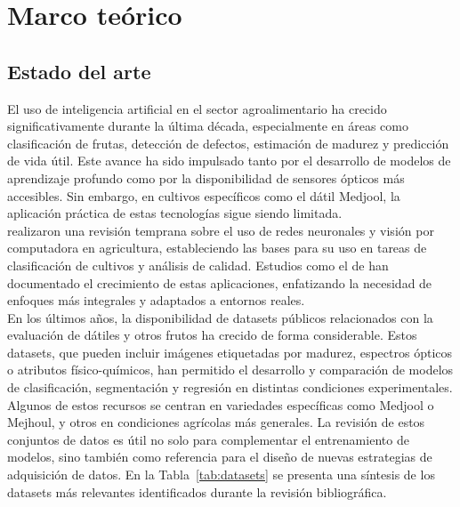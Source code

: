 
\chapter{Marco teórico}

\label{Chapter3}


\section{Estado del arte}

El uso de inteligencia artificial en el sector agroalimentario ha crecido significativamente durante la última década, especialmente en áreas como clasificación de frutas, detección de defectos, estimación de madurez y predicción de vida útil. Este avance ha sido impulsado tanto por el desarrollo de modelos de aprendizaje profundo como por la disponibilidad de sensores ópticos más accesibles. Sin embargo, en cultivos específicos como el dátil Medjool, la aplicación práctica de estas tecnologías sigue siendo limitada.\\

\parencite{kamilaris_deep_2018} realizaron una revisión temprana sobre el uso de redes neuronales y visión por computadora en agricultura, estableciendo las bases para su uso en tareas de clasificación de cultivos y análisis de calidad. Estudios como el de \parencite{garcia_vazquez_scientometric_2021, upadhyay_artificial_2025} han documentado el crecimiento de estas aplicaciones, enfatizando la necesidad de enfoques más integrales y adaptados a entornos reales.\\

En los últimos años, la disponibilidad de datasets públicos relacionados con la evaluación de dátiles y otros frutos ha crecido de forma considerable. Estos datasets, que pueden incluir imágenes etiquetadas por madurez, espectros ópticos o atributos físico-químicos, han permitido el desarrollo y comparación de modelos de clasificación, segmentación y regresión en distintas condiciones experimentales. Algunos de estos recursos se centran en variedades específicas como Medjool o Mejhoul, y otros en condiciones agrícolas más generales. La revisión de estos conjuntos de datos es útil no solo para complementar el entrenamiento de modelos, sino también como referencia para el diseño de nuevas estrategias de adquisición de datos. En la Tabla~\ref{tab:datasets} se presenta una síntesis de los datasets más relevantes identificados durante la revisión bibliográfica.\\

